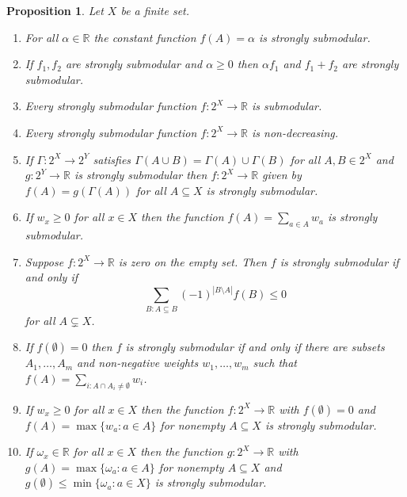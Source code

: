\documentclass{article}
\theoremstyle{plain}
\newtheorem{proposition}[theorem]{Proposition}
\theoremstyle{definition}
\renewcommand{\Re}{\mathbb{R}}
\begin{document}
\begin{proposition} \label{prop:basic_strong}
Let $X$ be a finite set.
\begin{enumerate}[label=(\roman*)]
\item For all $\alpha \in \Re$ the constant function $f(A) = \alpha$ is strongly submodular.
\item If $f_1,f_2$ are strongly submodular and $\alpha \geq 0$ then $\alpha f_1$ and $f_1 + f_2$ are strongly submodular.
\item Every strongly submodular function $f:2^X \rightarrow \Re$  is submodular.
\item Every strongly submodular function $f:2^X \rightarrow \Re$ is non-decreasing. %
\item If $\Gamma:2^X \rightarrow 2^Y$ satisfies $\Gamma(A \cup B) = \Gamma(A) \cup \Gamma(B)$ for all $A,B \in 2^X$ and $g:2^Y \rightarrow \Re$ is strongly submodular then $f:2^X \rightarrow \Re$ given by $f(A) = g(\Gamma(A))$ for all $A \subseteq X$ is strongly submodular. %
\item If $w_x \geq 0$ for all $x \in X$ then the function $f(A) = \sum_{a \in A} w_a$ is strongly submodular. %
\item Suppose $f:2^X \rightarrow \Re$ is zero on the empty set. Then $f$ is strongly submodular if and only if 
\begin{equation}
\sum_{B:A \subseteq B} (-1)^{|B \setminus A|} f(B) \leq 0 \label{eq:strong_moebius}
\end{equation}
for all $A \subsetneq X$.  %
\item If $f(\emptyset) = 0$ then $f$ is strongly submodular if and only if there are subsets $A_1,\ldots,A_m$ and non-negative weights $w_1,\ldots,w_m$ such that $f(A) = \sum_{i:A \cap A_i \neq \emptyset} w_i$. 
\item If $w_x \geq 0$ for all $x \in X$ then the function $f:2^X \rightarrow \Re$ with $f(\emptyset) = 0$ and $f(A) = \max\{w_a:a \in A\}$ for nonempty $A \subseteq X$ is strongly submodular. 
\item If $\omega_x \in \Re$ for all $x \in X$ then the function $g:2^X \rightarrow \Re$ with $g(A) = \max\{\omega_a:a \in A\}$ for nonempty $A \subseteq X$ and 
$g(\emptyset) \leq  \min\{\omega_a:a \in X\}$  is strongly submodular. 
\end{enumerate}
\end{proposition}
\end{document}
